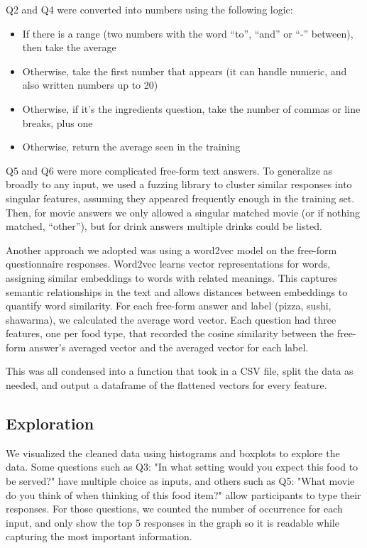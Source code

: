 Q2 and Q4 were converted into numbers using the following logic:
\begin{itemize}
    \item If there is a range (two numbers with the word “to”, “and” or “-” between), then take the average
    \item Otherwise, take the first number that appears (it can handle numeric, and also written numbers up to 20)
    \item Otherwise, if it's the ingredients question, take the number of commas or line breaks, plus one
    \item Otherwise, return the average seen in the training
\end{itemize}

Q5 and Q6 were more complicated free-form text answers. To generalize as broadly to any input, we used a fuzzing library to cluster similar responses into singular features, assuming they appeared frequently enough in the training set. Then, for movie answers we only allowed a singular matched movie (or if nothing matched, “other”), but for drink answers multiple drinks could be listed.

Another approach we adopted was using a word2vec model on the free-form questionnaire responses. Word2vec learns vector representations for words, assigning similar embeddings to words with related meanings. This captures semantic relationships in the text and allows distances between embeddings to quantify word similarity. For each free-form answer and label (pizza, sushi, shawarma), we calculated the average word vector. Each question had three features, one per food type, that recorded the cosine similarity between the free-form answer's averaged vector and the averaged vector for each label.

This was all condensed into a function that took in a CSV file, split the data as needed, and output a dataframe of the flattened vectors for every feature.


\subsection{Exploration}
\label{sec:exploration}
We visualized the cleaned data using histograms and boxplots to explore the data. Some questions such as Q3: "In what setting 
would you expect this food to be served?" have multiple choice as inputs, and others such as Q5: "What movie do you think of when thinking of this food item?"
allow participants to type their responses. For those questions, we counted the number of occurrence for each input, and only show the top 5 responses in the graph 
so it is readable while capturing the most important information.

